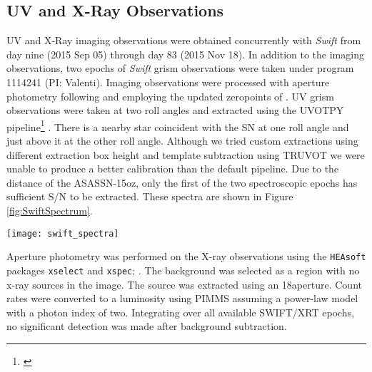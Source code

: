 \documentclass[a4paper,fleqn,usenatbib]{mnras}
\begin{document}
\subsection{UV and X-Ray Observations}\label{SecSwift}
UV and X-Ray imaging observations were obtained concurrently with \textit{Swift} from day nine (2015 Sep 05) through day 83 (2015 Nov 18).
In addition to the imaging observations, two epochs of \textit{Swift} grism observations were taken under program 1114241 (PI: Valenti). 
Imaging observations were processed with aperture photometry following \citet{2009brown} and employing the updated zeropoints of \citet{2010breeveld}.
UV grism observations were taken at two roll angles and extracted using the UVOTPY pipeline\footnote{\citet{2014kuin}} \citep{2015kuin}. 
There is a nearby star coincident with the SN at one roll angle and just above it at the other roll angle.
Although we tried custom extractions using different extraction box height and template subtraction using TRUVOT \citep{2015smitka} we were unable to produce a better calibration than the default pipeline. 
Due to the distance of the ASASSN-15oz, only the first of the two spectroscopic epochs has sufficient S/N to be extracted. 
These spectra are shown in Figure \ref{fig:SwiftSpectrum}.
\begin{figure*}
\begin{center}
\texttt{[image: swift\_spectra]} %
\caption{The {\it Swift }UV spectra from day nine (2015 Sep 05), boxcar smoothed with a kernel of three pixels. 
The spectrum taken with a roll angle of PA = 248$\rm{^{\circ}}$ is in pink, the  spectrum taken with a roll angle of PA = 260$\rm{^{\circ}}$ in purple, and average flux is in black.
We tentatively identify UV FeII, TiII, and MgII features as well as mark the Balmer lines.
These spectra are not template subtracted, therefore they show residuals from zeroth order light. These features can be identified as being in the spectrum of one roll angle but not the other.
The lack of narrow line emission indicates a lack of strong interaction.}
\label{fig:SwiftSpectrum}
\end{center}
\end{figure*}

Aperture photometry was performed on the X-ray observations using the  {\tt HEAsoft} packages {\tt xselect} \citep{blackburn_1995} and {\tt xspec}; \citep{arnaud_1996}.
The background was selected as a region with no x-ray sources in the image.
The source was extracted using an 18\arcsec aperture.
Count rates were converted to a luminosity using PIMMS \citep{mukai_1993} assuming a power-law model with a photon index of two.
Integrating over all available SWIFT/XRT epochs, no significant detection was made after background subtraction.
\end{document}
